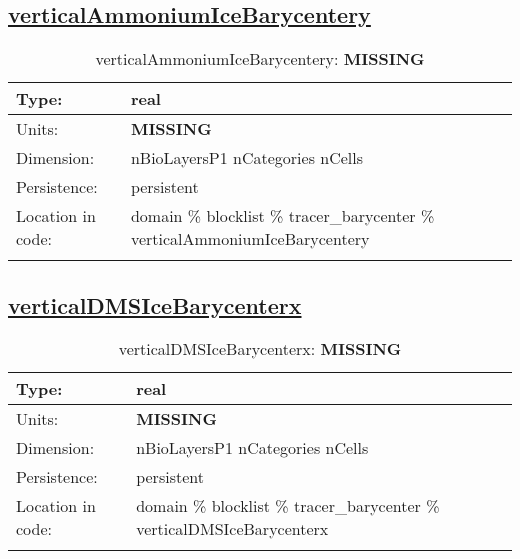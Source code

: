 \subsection[verticalAmmoniumIceBarycentery]{\hyperref[sec:var_tab_tracer_barycenter]{verticalAmmoniumIceBarycentery}}
\label{subsec:var_sec_tracer_barycenter_verticalAmmoniumIceBarycentery}
\begin{center}
\begin{longtable}{| p{2.0in} | p{4.0in} |}
        \hline 
        Type: & real \\
        \hline 
        Units: & {\bf \color{red} MISSING} \\
        \hline 
        Dimension: & nBioLayersP1 nCategories nCells \\
        \hline 
        Persistence: & persistent \\
        \hline 
         Location in code: & domain \% blocklist \% tracer\_barycenter \% verticalAmmoniumIceBarycentery \\
         \hline 
    \caption{verticalAmmoniumIceBarycentery: {\bf \color{red} MISSING}}
\end{longtable}
\end{center}
\subsection[verticalDMSIceBarycenterx]{\hyperref[sec:var_tab_tracer_barycenter]{verticalDMSIceBarycenterx}}
\label{subsec:var_sec_tracer_barycenter_verticalDMSIceBarycenterx}
\begin{center}
\begin{longtable}{| p{2.0in} | p{4.0in} |}
        \hline 
        Type: & real \\
        \hline 
        Units: & {\bf \color{red} MISSING} \\
        \hline 
        Dimension: & nBioLayersP1 nCategories nCells \\
        \hline 
        Persistence: & persistent \\
        \hline 
         Location in code: & domain \% blocklist \% tracer\_barycenter \% verticalDMSIceBarycenterx \\
         \hline 
    \caption{verticalDMSIceBarycenterx: {\bf \color{red} MISSING}}
\end{longtable}
\end{center}
